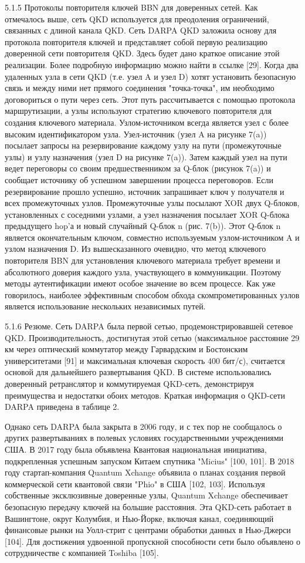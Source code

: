 5.1.5 Протоколы повторителя ключей BBN для доверенных сетей. Как отмечалось выше, сеть QKD используется для преодоления ограничений, связанных с длиной канала QKD. Сеть DARPA QKD заложила основу для протокола повторителя ключей и представляет собой первую реализацию доверенной сети повторителя QKD. Здесь будет дано краткое описание этой реализации. Более подробную информацию можно найти в ссылке [29].
Когда два удаленных узла в сети QKD (т.е. узел A и узел D) хотят установить безопасную связь и между ними нет прямого соединения "точка-точка", им необходимо договориться о пути через сеть. Этот путь рассчитывается с помощью протокола маршрутизации, а узлы используют стратегию ключевого повторителя для создания ключевого материала. Узлом-источником всегда является узел с более высоким идентификатором узла. Узел-источник (узел A на рисунке 7(a)) посылает запросы на резервирование каждому узлу на пути (промежуточные узлы) и узлу назначения (узел D на рисунке 7(a)). Затем каждый узел на пути ведет переговоры со своим предшественником за Q-блок (рисунок 7(a)) и сообщает источнику об успешном завершении процесса переговоров. Если резервирование прошло успешно, источник запрашивает ключ у получателя и всех промежуточных узлов. Промежуточные узлы посылают XOR двух Q-блоков, установленных с соседними узлами, а узел назначения посылает XOR Q-блока предыдущего hop'а и новый случайный Q-блок n (рис. 7(b)). Этот Q-блок n является окончательным ключом, совместно используемым узлом-источником A и узлом назначения D.
Из вышесказанного очевидно, что метод ключевого повторителя BBN для установления ключевого материала требует времени и абсолютного доверия каждого узла, участвующего в коммуникации. Поэтому методы аутентификации имеют особое значение во всем процессе. Как уже говорилось, наиболее эффективным способом обхода скомпрометированных узлов является использование нескольких независимых путей.


5.1.6 Резюме. Сеть DARPA была первой сетью, продемонстрировавшей сетевое QKD.
Производительность, достигнутая этой сетью (максимальное расстояние 29 км через оптический коммутатор между Гарвардским и Бостонским университетами [91] и максимальная ключевая скорость 400 бит/с), считается основой для дальнейшего развертывания QKD. В системе использовались доверенный ретранслятор и коммутируемая QKD-сеть, демонстрируя преимущества и недостатки обоих методов. Краткая информация о QKD-сети DARPA приведена в таблице 2.

Однако сеть DARPA была закрыта в 2006 году, и с тех пор не сообщалось о других развертываниях в полевых условиях государственными учреждениями США. В 2017 году была объявлена Квантовая национальная инициатива, подкрепленная успешным запуском Китаем спутника "Micius" [100, 101]. В 2018 году стартап-компания Quantum Xchange объявила о планах создания первой коммерческой сети квантовой связи "Phio" в США [102, 103]. Используя собственные эксклюзивные доверенные узлы, Quantum Xchange обеспечивает безопасную передачу ключей на большие расстояния. Эта QKD-сеть работает в Вашингтоне, округ Колумбия, и Нью-Йорке, включая канал, соединяющий финансовые рынки на Уолл-стрит с центрами обработки данных в Нью-Джерси [104]. Для достижения удвоенной пропускной способности сети было объявлено о сотрудничестве с компанией Toshiba [105].

